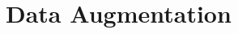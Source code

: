 \documentclass[../main.tex]{subfiles}
\begin{document}
    \section{Data Augmentation}
        
        
        
\end{document}
